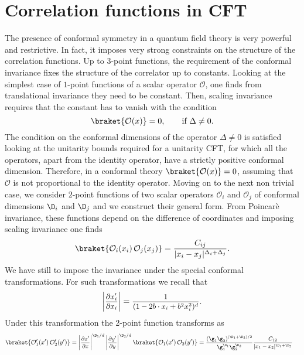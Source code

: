 \documentclass[a4paper,11pt,openright,twoside]{book}
\newcommand{\mO}{\mathcal{O}}
\newcommand{\sdfrac}[2]{\mbox{\small$\displaystyle\frac{#1}{#2}$}}
\numberwithin{equation}{section}
\begin{document}
\section{Correlation functions in CFT\label{secCFT}}
The presence of conformal symmetry in a quantum field theory is very powerful and restrictive. In fact, it imposes very strong constraints on the structure of the correlation functions. Up to $3$-point functions, the requirement of the conformal invariance fixes the structure of the correlator up to constants. 
Looking at the simplest case of $1$-point functions of a scalar operator $\mathcal{O}$, one finds from translational invariance they need to be constant. Then, scaling invariance requires that the constant has to vanish with the condition
\begin{equation}
	\braket{\mathcal{O}(x)}=0,\qquad \text{if}\ \Delta\ne0.
\end{equation}
The condition on the conformal dimensions of the operator $\Delta\ne0$ is satisfied looking at the unitarity bounds required for a unitarity CFT, for which all the operators, apart from the identity operator, have a strictly positive conformal dimension. Therefore, in a conformal theory $\braket{\mathcal{O}(x)}=0$, assuming that $\mathcal{O}$ is not proportional to the identity operator. 
Moving on to the next non trivial case, we consider $2$-point functions of two scalar operators $\mO_i$ and $\mO_j$ of conformal dimensions $\D_i$ and $\D_j$ and we construct their general form. From Poincar\`e invariance, these functions depend on the difference of coordinates and imposing scaling invariance one finds 
\begin{equation}
	\braket{\mO_i(x_i)\,\mO_j(x_j)}=\frac{C_{ij}}{|x_i-x_j|^{\Delta_i+\Delta_j}}.
\end{equation}
We have still to impose the invariance under the special conformal transformations. For such transformations we recall that
\begin{equation}
	\left|\sdfrac{\partial x'_i}{\partial x_i}\right|=\sdfrac{1}{(1-2b\cdot x_i+b^2 x_i^2)^d}.
\end{equation} 
Under this transformation the 2-point function transforms as
\begin{align}
	\braket{\mO'_1(x')\,\mO'_2(y')}&=\left|\sdfrac{\partial x'}{\partial x}\right|^{\D_1/d}\left|\sdfrac{\partial y'}{\partial y}\right|^{\D_2/d}\braket{\mO_1(x')\,\mO_2(y')}=\sdfrac{(\g_1\g_2)^{(\D_1+\D_2)/2}}{\g_1^{\D_1}\g_2^{\D_2}}\sdfrac{C_{12}}{|x_1-x_2|^{\D_1+\D_2}}
\end{align}
\end{document}
